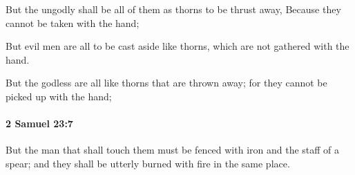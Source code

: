 			\begin{versebox}
					\item[BHS] 
					\item[ASV] But the ungodly shall be all of them as thorns to be thrust away, Because they cannot be taken with the hand;
					\item[NIV] But evil men are all to be cast aside like thorns, which are not gathered with the hand.
					\item[NRSV] But the godless are all like thorns that are thrown away; for they cannot be picked up with the hand;
			\end{versebox}

		\paragraph{2 Samuel 23:7} %
			\label{2SAMUEL-23-7}

			But the man that shall touch them must be fenced with iron and the staff of a spear; and they shall be utterly burned with fire in the same place.


